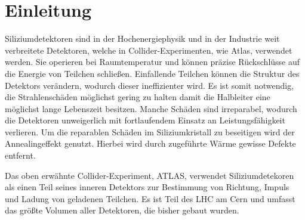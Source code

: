 \chapter{Einleitung}
Siliziumdetektoren sind in der Hochenergiephysik und in der Industrie weit verbreitete
Detektoren, welche in Collider-Experimenten, wie Atlas, verwendet werden.
Sie operieren bei Raumtemperatur und können präzise Rückschlüsse auf die
Energie von Teilchen schließen. Einfallende Teilchen können die
Struktur des Detektors verändern, wodurch dieser ineffizienter wird.
Es ist somit notwendig, die Strahlenschäden möglichst gering zu halten damit
die Halbleiter eine möglichst lange Lebenszeit besitzen. Manche Schäden sind
irreparabel, wodurch die Detektoren unweigerlich mit fortlaufendem Einsatz
an Leistungsfähigkeit verlieren. Um die reparablen Schäden im Siliziumkristall
zu beseitigen wird der Annealingeffekt genutzt. Hierbei wird durch zugeführte Wärme gewisse
Defekte entfernt.

Das oben erwähnte Collider-Experiment, ATLAS, verwendet Siliziumdetekoren als
einen Teil seines inneren Detektors zur Bestimmung von Richtung, Impuls
und Ladung von geladenen Teilchen. Es ist Teil des LHC am Cern und umfasst
das größte Volumen aller Detektoren, die bisher gebaut wurden\cite{atlas}.
